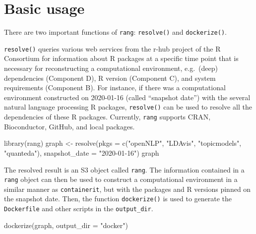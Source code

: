 \documentclass[
  10pt,
  letterpaper,
]{article}
\newenvironment{Shaded}{\begin{snugshade}}{\end{snugshade}}
\newcommand{\AttributeTok}[1]{\textcolor[rgb]{0.40,0.45,0.13}{#1}}
\newcommand{\FunctionTok}[1]{\textcolor[rgb]{0.28,0.35,0.67}{#1}}
\newcommand{\NormalTok}[1]{\textcolor[rgb]{0.00,0.23,0.31}{#1}}
\newcommand{\OtherTok}[1]{\textcolor[rgb]{0.00,0.23,0.31}{#1}}
\newcommand{\StringTok}[1]{\textcolor[rgb]{0.13,0.47,0.30}{#1}}
\begin{document}
\hypertarget{basic-usage}{%
\section{Basic usage}\label{basic-usage}}

There are two important functions of \texttt{rang}: \texttt{resolve()}
and \texttt{dockerize()}.

\texttt{resolve()} queries various web services from the r-hub project
of the R Consortium for information about R packages at a specific time
point that is necessary for reconstructing a computational environment,
e.g.~(deep) dependencies (Component D), R version (Component C), and
system requirements (Component B). For instance, if there was a
computational environment constructed on 2020-01-16 (called ``snapshot
date'') with the several natural language processing R packages,
\texttt{resolve()} can be used to resolve all the dependencies of these
R packages. Currently, \texttt{rang} supports CRAN, Bioconductor,
GitHub, and local packages.

\begin{Shaded}
\begin{Highlighting}[]
\FunctionTok{library}\NormalTok{(rang)}
\NormalTok{graph }\OtherTok{\textless{}{-}} \FunctionTok{resolve}\NormalTok{(}\AttributeTok{pkgs =} \FunctionTok{c}\NormalTok{(}\StringTok{"openNLP"}\NormalTok{, }\StringTok{"LDAvis"}\NormalTok{, }\StringTok{"topicmodels"}\NormalTok{, }\StringTok{"quanteda"}\NormalTok{),}
                 \AttributeTok{snapshot\_date =} \StringTok{"2020{-}01{-}16"}\NormalTok{)}
\NormalTok{graph}
\end{Highlighting}
\end{Shaded}

The resolved result is an S3 object called \texttt{rang}. The
information contained in a \texttt{rang} object can then be used to
construct a computational environment in a similar manner as
\texttt{containerit}, but with the packages and R versions pinned on the
snapshot date. Then, the function \texttt{dockerize()} is used to
generate the \texttt{Dockerfile} and other scripts in the
\texttt{output\_dir}.

\begin{Shaded}
\begin{Highlighting}[]
\FunctionTok{dockerize}\NormalTok{(graph, }\AttributeTok{output\_dir =} \StringTok{"docker"}\NormalTok{)}
\end{Highlighting}
\end{Shaded}
\end{document}

